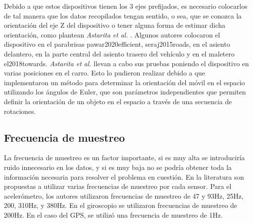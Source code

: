		Debido a que estos dispositivos tienen los 3 ejes prefijados, es necesario colocarlos de tal manera que los datos recopilados tengan sentido, o sea,
		que se conozca la orientación del eje Z del dispositivo o tener alguna forma de estimar dicha orientación, como plantean \emph{Astarita et al.}
		. Algunos autores colocaron el dispositivo en el parabrisas\brackcite
		{pawar2020efficient, seraj2015roads}, en el asiento delantero, en la parte central del asiento trasero del vehículo y en el maletero\brackcite
		{el2018towards}. \emph{Astarita et al.} llevan a cabo sus pruebas poniendo el dispositivo en varias posiciones en
		el carro. Esto lo pudieron realizar debido a que implementaron un método para determinar la orientación del móvil en el espacio utilizando los
		ángulos de Euler, que son parámetros independientes que permiten definir la orientación de un objeto en el espacio a través de una secuencia de
		rotaciones.
		
	\subsection{Frecuencia de muestreo}
		La frecuencia de muestreo es un factor importante, si es muy alta se introduciría ruido innecesario en los datos, y si es muy baja no se podría
		obtener toda la información necesaria para resolver el problema en cuestión. En la literatura son propuestas a utilizar varias 
		frecuencias  de muestreo por cada sensor. Para el acelerómetro, los autores utilizaron frecuencias de muestreo de 47 y 93Hz, 
		25Hz, 200, 310Hz, y 380Hz. En 
		el giroscopio se utilizaron frecuencias de muestreo de 200Hz. En el caso del GPS, se utilizó una frecuencia de muestreo 
		de 1Hz. 
		

